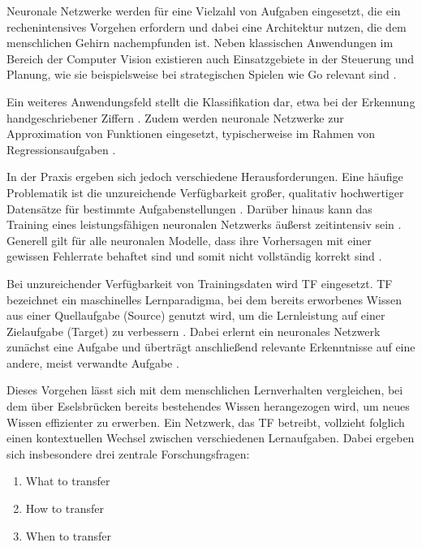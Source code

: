 \newline
Neuronale Netzwerke werden für eine Vielzahl von Aufgaben eingesetzt, die ein rechenintensives Vorgehen erfordern und dabei eine Architektur 
nutzen, die dem menschlichen Gehirn nachempfunden ist. Neben klassischen Anwendungen im Bereich der Computer Vision existieren auch 
Einsatzgebiete in der Steuerung und Planung, wie sie beispielsweise bei strategischen Spielen wie Go relevant sind 
\cite{deep_neural_networks_scientific_models}.

Ein weiteres Anwendungsfeld stellt die Klassifikation dar, etwa bei der Erkennung handgeschriebener Ziffern \cite{handwritten_digit}. 
Zudem werden neuronale Netzwerke zur Approximation von Funktionen eingesetzt, typischerweise im Rahmen von Regressionsaufgaben \cite{Gen_Reg}.

In der Praxis ergeben sich jedoch verschiedene Herausforderungen. Eine häufige Problematik ist die unzureichende Verfügbarkeit großer, 
qualitativ hochwertiger Datensätze für bestimmte Aufgabenstellungen \cite{survey_transfer}. Darüber hinaus kann das Training eines 
leistungsfähigen neuronalen Netzwerks äußerst zeitintensiv sein \cite{cascor}. Generell gilt für alle neuronalen Modelle, dass ihre 
Vorhersagen mit einer gewissen Fehlerrate behaftet sind und somit nicht vollständig korrekt sind \cite{EvoClassAndReg}.

Bei unzureichender Verfügbarkeit von Trainingsdaten wird TF eingesetzt. 
TF bezeichnet ein maschinelles Lernparadigma, bei dem bereits erworbenes Wissen aus einer Quellaufgabe (Source) genutzt 
wird, um die Lernleistung auf einer Zielaufgabe (Target) zu verbessern \cite{transfer_learning}. Dabei erlernt ein neuronales Netzwerk 
zunächst eine Aufgabe und überträgt anschließend relevante Erkenntnisse auf eine andere, meist verwandte Aufgabe \cite{phd_deep_cascade}.

Dieses Vorgehen lässt sich mit dem menschlichen Lernverhalten vergleichen, bei dem über Eselsbrücken bereits bestehendes Wissen herangezogen 
wird, um neues Wissen effizienter zu erwerben. Ein Netzwerk, das TF betreibt, vollzieht folglich einen kontextuellen Wechsel 
zwischen verschiedenen Lernaufgaben. Dabei ergeben sich insbesondere drei zentrale Forschungsfragen:

\begin{enumerate}
    \item What to transfer
    \item How to transfer
    \item When to transfer
\end{enumerate}
\cite{survey_transfer}

